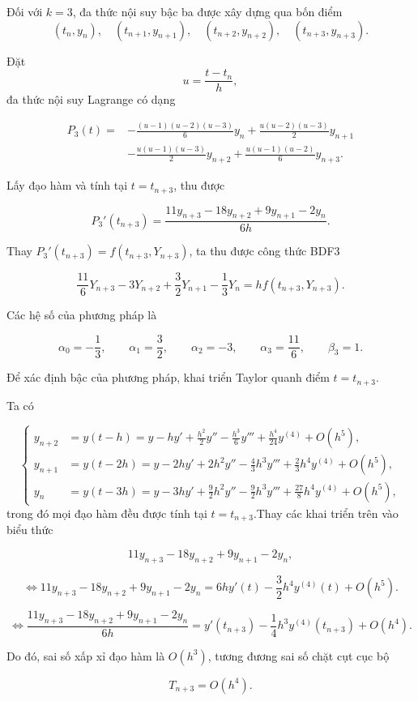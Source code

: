Đối với $k=3$, đa thức nội suy bậc ba được xây dựng qua bốn điểm
\[
(t_n,y_n),\quad
(t_{n+1},y_{n+1}),\quad
(t_{n+2},y_{n+2}),\quad
(t_{n+3},y_{n+3}).
\]

Đặt
\[
u=\frac{t-t_n}{h},
\]
đa thức nội suy Lagrange có dạng

\[
\begin{aligned}
P_3(t)
={}&
-\frac{(u-1)(u-2)(u-3)}{6}y_n
+\frac{u(u-2)(u-3)}{2}y_{n+1}  \\
&
-\frac{u(u-1)(u-3)}{2}y_{n+2}
+\frac{u(u-1)(u-2)}{6}y_{n+3}.
\end{aligned}
\]

Lấy đạo hàm và tính tại $t=t_{n+3}$, thu được

\[
P_3'(t_{n+3})
=
\frac{11y_{n+3}-18y_{n+2}+9y_{n+1}-2y_n}{6h}.
\]

Thay $P_3'(t_{n+3})=f(t_{n+3},Y_{n+3})$, ta thu được công thức BDF3

\[
\frac{11}{6}Y_{n+3}
-3Y_{n+2}
+\frac32Y_{n+1}
-\frac13Y_n
=
hf(t_{n+3},Y_{n+3}).
\]

Các hệ số của phương pháp là

\[
\alpha_0=-\frac13,\qquad
\alpha_1=\frac32,\qquad
\alpha_2=-3,\qquad
\alpha_3=\frac{11}{6},\qquad
\beta_3=1.
\]

Để xác định bậc của phương pháp, khai triển Taylor quanh điểm
$t=t_{n+3}$.

Ta có

\[
\left\{
\begin{aligned}
y_{n+2} &= y(t-h) = y-hy'+\frac{h^2}{2}y''-\frac{h^3}{6}y'''+\frac{h^4}{24}y^{(4)}+O(h^5),\\
y_{n+1}&=y(t-2h) = y-2hy'+2h^2y''-\frac43h^3y'''+\frac23h^4y^{(4)}+O(h^5),\\
y_n&=y(t-3h) = y-3hy'+\frac92h^2y''-\frac92h^3y'''+\frac{27}{8}h^4y^{(4)}+O(h^5),
\end{aligned}
\right.
\]
trong đó mọi đạo hàm đều được tính tại $t=t_{n+3}$.Thay các khai triển trên vào biểu thức

\[
11y_{n+3}
-18y_{n+2}
+9y_{n+1}
-2y_n,
\]

\[
\Leftrightarrow 11y_{n+3}-18y_{n+2}+9y_{n+1}-2y_n=6hy'(t)-\frac32h^4y^{(4)}(t) +O(h^5).
\]

\[
\Leftrightarrow\frac{11y_{n+3}-18y_{n+2}+9y_{n+1}-2y_n}{6h}=y'(t_{n+3})-\frac14h^3y^{(4)}(t_{n+3})+O(h^4).
\]

Do đó, sai số xấp xỉ đạo hàm là $O(h^3)$, tương đương sai số chặt cụt cục bộ

\[
T_{n+3}=O(h^4).
\]

